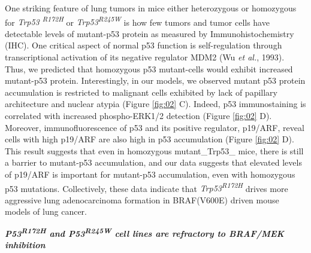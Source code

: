 One striking feature of lung tumors in mice either heterozygous or homozygous for \emph{Trp53 \textsuperscript{R172H}} or \emph{Trp53\textsuperscript{R245W}} is how few tumors and tumor cells have detectable levels of mutant-p53 protein as measured by Immunohistochemistry (IHC). One critical aspect of normal p53 function is self-regulation through transcriptional activation of its negative regulator MDM2 (Wu \emph{et al.}, 1993). Thus, we predicted that homozygous p53 mutant-cells would exhibit increased mutant-p53 protein. Interestingly, in our models, we observed mutant p53 protein accumulation is restricted to malignant cells exhibited by lack of papillary architecture and nuclear atypia (Figure \ref{fig:02} C). Indeed, p53 immunostaining is correlated with increased phospho-ERK1/2 detection (Figure \ref{fig:02} D). Moreover, immunofluorescence of p53 and its positive regulator, p19/ARF, reveal cells with high p19/ARF are also high in p53 accumulation (Figure \ref{fig:02} D). This result suggests that even in homozygous mutant\_Trp53\_ mice, there is still a barrier to mutant-p53 accumulation, and our data suggests that elevated levels of p19/ARF is important for mutant-p53 accumulation, even with homozygous p53 mutations. Collectively, these data indicate that \emph{Trp53\textsuperscript{R172H}} drives more aggressive lung adenocarcinoma formation in BRAF(V600E) driven mouse models of lung cancer.

\emph{\textbf{P53\textsuperscript{R172H} and P53\textsuperscript{R245W} cell lines are refractory to BRAF/MEK inhibition}}


